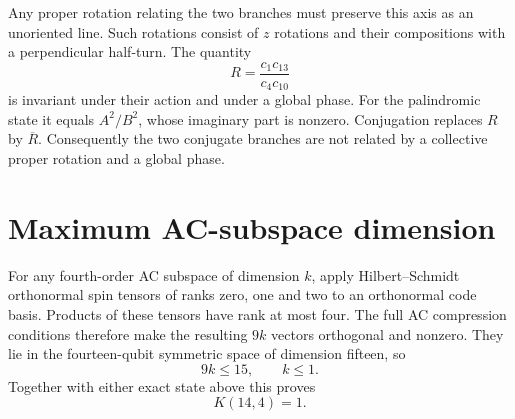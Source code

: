 \documentclass[11pt]{article}
\begin{document}
Any proper rotation relating the two branches must preserve this axis as an
unoriented line. Such rotations consist of $z$ rotations and their compositions
with a perpendicular half-turn. The quantity
\[
 R=\frac{c_1c_{13}}{c_4c_{10}}
\]
is invariant under their action and under a global phase. For the palindromic
state it equals $A^2/B^2$, whose imaginary part is nonzero. Conjugation replaces
$R$ by $\overline R$. Consequently the two conjugate branches are not related
by a collective proper rotation and a global phase.

\section{Maximum AC-subspace dimension}
For any fourth-order AC subspace of dimension $k$, apply Hilbert--Schmidt
orthonormal spin tensors of ranks zero, one and two to an orthonormal code basis.
Products of these tensors have rank at most four. The full AC compression
conditions therefore make the resulting $9k$ vectors orthogonal and nonzero.
They lie in the fourteen-qubit symmetric space of dimension fifteen, so
\[
 9k\le15,\qquad k\le1.
\]
Together with either exact state above this proves
\[
 \boxed{K(14,4)=1.}
\]
\end{document}
